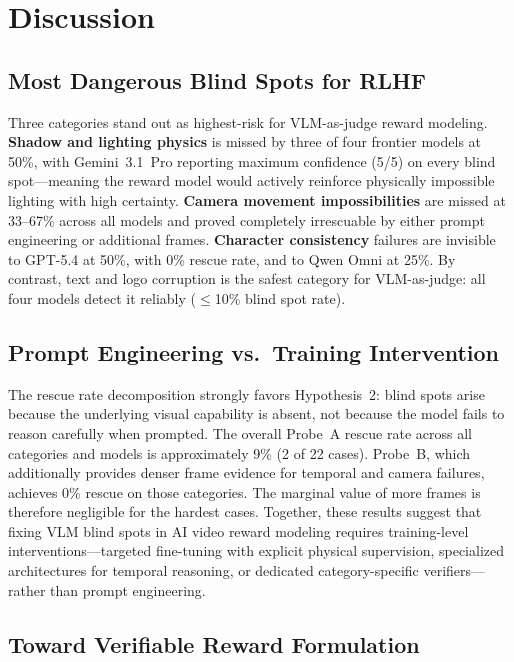 \documentclass[11pt]{article}
\begin{document}
\section{Discussion}

\subsection{Most Dangerous Blind Spots for RLHF}

Three categories stand out as highest-risk for VLM-as-judge reward modeling. \textbf{Shadow and lighting physics} is missed by three of four frontier models at 50\%, with Gemini~3.1~Pro reporting maximum confidence (5/5) on every blind spot---meaning the reward model would actively reinforce physically impossible lighting with high certainty. \textbf{Camera movement impossibilities} are missed at 33--67\% across all models and proved completely irrescuable by either prompt engineering or additional frames. \textbf{Character consistency} failures are invisible to GPT-5.4 at 50\%, with 0\% rescue rate, and to Qwen Omni at 25\%. By contrast, text and logo corruption is the safest category for VLM-as-judge: all four models detect it reliably ($\leq$10\% blind spot rate).

\subsection{Prompt Engineering vs.\ Training Intervention}

The rescue rate decomposition strongly favors Hypothesis~2: blind spots arise because the underlying visual capability is absent, not because the model fails to reason carefully when prompted. The overall Probe~A rescue rate across all categories and models is approximately 9\% (2 of 22 cases). Probe~B, which additionally provides denser frame evidence for temporal and camera failures, achieves 0\% rescue on those categories. The marginal value of more frames is therefore negligible for the hardest cases. Together, these results suggest that fixing VLM blind spots in AI video reward modeling requires training-level interventions---targeted fine-tuning with explicit physical supervision, specialized architectures for temporal reasoning, or dedicated category-specific verifiers---rather than prompt engineering.

\subsection{Toward Verifiable Reward Formulation}
\end{document}

